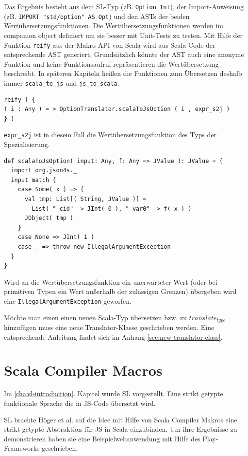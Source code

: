 \documentclass[12pt,bibtotoc]{scrreprt}
\begin{document}
Das Ergebnis besteht aus dem SL-Typ (zB. \lstinline!Option Int!), der Import-Anweisung (zB. \lstinline!IMPORT "std/option" AS Opt!) und den ASTs der beiden Wertübersetzungsfunktionen. Die Wertübersetzungsfunktionen werden im companion object definiert um sie besser mit Unit-Tests zu testen. Mit Hilfe der Funktion \lstinline!reify! aus der Makro API von Scala wird aus Scala-Code der entsprechende AST generiert. Grundsätzlich könnte der AST auch eine anonyme Funktion und keine Funktionsaufruf repräsentieren die Wertübersetzung beschreibt. In späteren Kapiteln heißen die Funktionen zum Übersetzen deshalb immer \lstinline!scala_to_js! und \lstinline!js_to_scala!.

\begin{lstlisting}
reify ( {
( i : Any ) = > OptionTranslator.scalaToJsOption ( i , expr_s2j )
} )
\end{lstlisting}

\lstinline!expr_s2j! ist in diesem Fall die Wertübersetzungsfunktion des Typs der Spezialisierung. 

\begin{lstlisting}
def scalaToJsOption( input: Any, f: Any => JValue ): JValue = {
  import org.json4s._
  input match {
    case Some( x ) => {
      val tmp: List[( String, JValue )] = 
        List( "_cid" -> JInt( 0 ), "_var0" -> f( x ) )
      JObject( tmp )
    }
    case None => JInt( 1 )
    case _ => throw new IllegalArgumentException
  }
}
\end{lstlisting}

Wird an die Wertübersetzungsfunktion ein unerwarteter Wert (oder bei primitiven Typen ein Wert außerhalb der zulässigen Grenzen) übergeben wird eine \lstinline!IllegalArgumentException! geworfen.

Möchte man einen einen neuen Scala-Typ übersetzen bzw. zu $translate_{type}$ hinzufügen muss eine neue Translator-Klasse geschrieben werden. Eine entsprechende Anleitung findet sich im Anhang \ref{sec:new-translator-class}.

\chapter{Scala Compiler Macros}
\label{chap:scala-compiler-macros}

Im \ref{cha:sl-introduction}. Kapitel wurde SL vorgestellt. Eine strikt getypte funktionale Sprache die in JS-Code übersetzt wird.

SL brachte Höger et al. auf die Idee mit Hilfe von Scala Compiler Makros eine strikt getypte Abstraktion für JS in Scala einzubinden\cite{Hoger2013}. Um ihre Ergebnisse zu demonstrieren haben sie eine Beispielwebanwendung mit Hilfe des Play-Frameworks\cite{Play1} geschrieben. 
\end{document}
